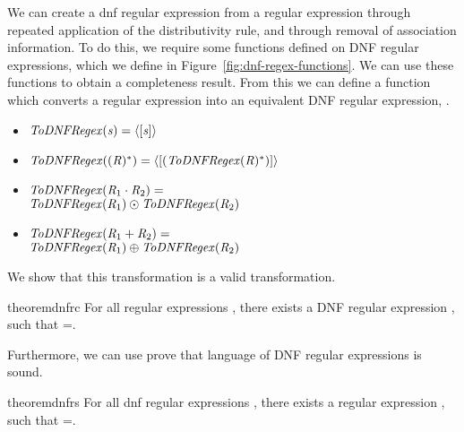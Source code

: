 
We can create a dnf regular expression from a regular expression through repeated
application of the distributivity rule, and through removal of association information.  To do this, we require some functions defined on DNF regular expressions,
which we define in Figure~\ref{fig:dnf-regex-functions}.
We can use these functions to obtain a completeness result.
From this we can define a function which converts a regular expression into
an equivalent DNF regular expression, \ToDNFRegex{}.  
\begin{definition}
\leavevmode
\begin{itemize}
\item $\mathit{ToDNFRegex}(\mathit{s})=\langle[\mathit{s}]\rangle$
\item $\mathit{ToDNFRegex}((\mathit{R})^*) = \langle[(\mathit{ToDNFRegex}(\mathit{R})^*)]\rangle$
\item $\mathit{ToDNFRegex}(\mathit{R}_1\cdot\mathit{R}_2) =$\\
\hspace*{1em}$\mathit{ToDNFRegex}(\mathit{R}_1)\odot\mathit{ToDNFRegex}(\mathit{R}_2)$
\item $\mathit{ToDNFRegex}(\mathit{R}_1+\mathit{R}_2) =$\\
\hspace*{1em}$\mathit{ToDNFRegex}(\mathit{R}_1)\oplus\mathit{ToDNFRegex}(\mathit{R}_2)$
\end{itemize}
\end{definition}
We show that this transformation is a valid transformation.
\begin{restatable}{theorem}{dnfrc}
\label{thm:completeness-dnf-lenses}
For all regular expressions \Regex{},
there exists a DNF regular expression \DNFRegex{},
such that \LanguageOf{\DNFRegex{}}=\LanguageOf{\Regex{}}.
\end{restatable}

Furthermore, we can use prove that language of DNF regular expressions is sound.

\begin{restatable}{theorem}{dnfrs}
\label{thm:soundness-dnf-lenses}
For all dnf regular expressions \DNFRegex{},
there exists a regular expression \Regex{},
such that \LanguageOf{\Regex{}}=\LanguageOf{\DNFRegex{}}.
\end{restatable}


